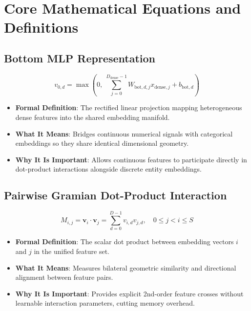 \documentclass[11pt,a4paper]{article}
\theoremstyle{definition}
\begin{document}
\section{Core Mathematical Equations and Definitions}

\subsection{Bottom MLP Representation}
{\boldmath
\begin{equation}
v_{0, d} = \max\left( 0, \; \sum_{j=0}^{D_{\text{dense}}-1} W_{\text{bot}, d, j} x_{\text{dense}, j} + b_{\text{bot}, d} \right)
\end{equation}
}
\begin{itemize}
    \item \textbf{Formal Definition}: The rectified linear projection mapping heterogeneous dense features into the shared embedding manifold.
    \item \textbf{What It Means}: Bridges continuous numerical signals with categorical embeddings so they share identical dimensional geometry.
    \item \textbf{Why It Is Important}: Allows continuous features to participate directly in dot-product interactions alongside discrete entity embeddings.
\end{itemize}

\subsection{Pairwise Gramian Dot-Product Interaction}
{\boldmath
\begin{equation}
M_{i, j} = \mathbf{v}_i \cdot \mathbf{v}_j = \sum_{d=0}^{D-1} v_{i, d} v_{j, d}, \quad 0 \le j < i \le S
\end{equation}
}
\begin{itemize}
    \item \textbf{Formal Definition}: The scalar dot product between embedding vectors $i$ and $j$ in the unified feature set.
    \item \textbf{What It Means}: Measures bilateral geometric similarity and directional alignment between feature pairs.
    \item \textbf{Why It Is Important}: Provides explicit 2nd-order feature crosses without learnable interaction parameters, cutting memory overhead.
\end{itemize}
\end{document}
